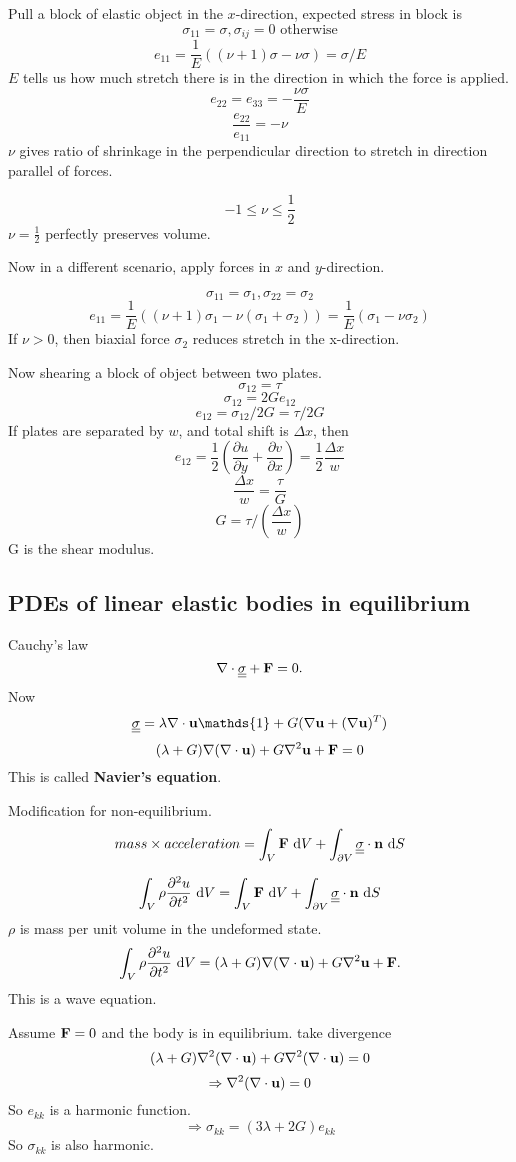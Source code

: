 \documentclass[12pt]{article}
\newcommand{\nn}{{\bf n}}
\newcommand{\uu}{{\bf u}}
\newcommand{\FF}{{\bf F}}
\newcommand{\bnabla}{{\bf \nabla}}
\newcommand{\ssigma}{{\underline{\underline \sigma}}}
\newcommand{\dx}[1]{\text{ d}#1}
\begin{document}
Pull a block of elastic object in the $x$-direction, expected stress in block is
\[
\sigma_{11} = \sigma, \sigma_{ij} = 0 \text{ otherwise}
\]
\[
e_{11} = \frac 1 E ((\nu+1)\sigma - \nu\sigma) = \sigma/E
\]
$E$ tells us how much stretch there is in the direction in which the force is applied.
\[
e_{22} = e_{33} = -\frac{\nu\sigma}{E}
\]
\[
\frac{e_{22}}{e_{11}} = -\nu
\]
$\nu$ gives ratio of shrinkage in the perpendicular direction to stretch in direction parallel of forces.

\[
-1\leq\nu\leq \frac 1 2
\]
$\nu = \frac 1 2 $ perfectly preserves volume. 

Now in a different scenario, apply forces in $x$ and $y$-direction.

\[
\sigma_{11}  = \sigma_1, \sigma_{22} = \sigma_2
\]
\[
e_{11} = \frac 1 E ((\nu+1)\sigma_1 - \nu(\sigma_1 + \sigma_2))  = \frac 1 E (\sigma_1 - \nu\sigma_2)
\]
If $\nu>0$, then biaxial force $\sigma_2$ reduces stretch in the x-direction.


Now shearing a block of object between two plates.
\[
\sigma_{12} = \tau
\]
\[
\sigma_{12} = 2Ge_{12}
\]
\[
e_{12} = \sigma_{12}/2G = \tau/2G
\]
If plates are separated by $w$, and total shift is $\Delta x$, then 
\[
e_{12} = \frac 1 2 (\frac{\partial u }{\partial y } + \frac{\partial v}{\partial x} ) = \frac 1 2 \frac{ \Delta x }{ w} 
\]
\[
 \frac{ \Delta x }{ w} = \frac \tau G
\]
\[
G = \tau / (\frac{\Delta x }{w})
\]
G is the shear modulus.

\subsection{PDEs of linear elastic bodies in equilibrium}
Cauchy's law
\[
\bnabla\cdot\ssigma  + \FF = 0.
\]
Now 
\[
\ssigma = \lambda \bnabla\cdot\uu \mathds{1} + G(\bnabla\uu + (\bnabla\uu)^T)
\]
\[
(\lambda + G)\bnabla(\bnabla\cdot \uu) + G\nabla^2\uu + \FF = 0
\]
This is called {\bf Navier's equation}.

Modification for non-equilibrium.
\[
mass\times acceleration  =\int_V\FF\dx{V} + \int_{\partial V}\ssigma\cdot\nn\dx{S}
\]

\[
\int_V\rho\frac{\partial^2 u}{\partial t^2} \dx{V} =\int_V\FF\dx{V} + \int_{\partial V}\ssigma\cdot\nn\dx{S}
\]
$\rho$ is mass per unit volume in the undeformed state.
\[
\int_V\rho\frac{\partial^2 u}{\partial t^2} \dx{V} = (\lambda + G)\bnabla(\bnabla\cdot \uu) + G\nabla^2\uu + \FF .
\]
This is a wave equation.

Assume $\FF=0$ and the body is in equilibrium. take divergence
\[
(\lambda + G)\bnabla^2(\bnabla\cdot \uu) + G\nabla^2(\nabla\cdot\uu)=0
\]
\[
\Rightarrow \nabla^2(\nabla\cdot\uu)=0
\]
So $e_{kk}$ is a harmonic function.
\[
\Rightarrow \sigma_{kk} = (3\lambda + 2G)e_{kk}
\]
So $\sigma_{kk}$ is also harmonic.
\end{document}
